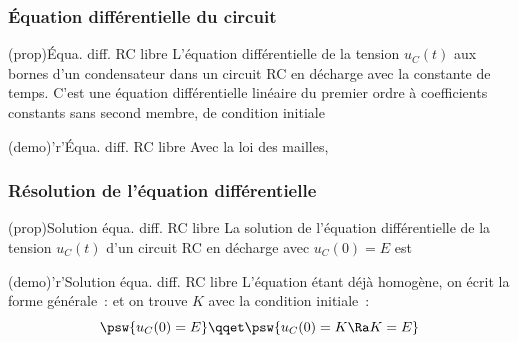 \documentclass[../../main/main.tex]{subfiles}
\begin{document}
\subsubsection{Équation différentielle du circuit}
\begin{tcbraster}[raster columns=2, raster equal height=rows]
	\begin{tcb}[label=prop:eqdiffrc](prop){Équa. diff. RC libre}
		L'équation différentielle de la tension $u_C(t)$ aux bornes d'un
		condensateur dans un circuit RC en décharge
		\psw{
			\[ \boxed{\dv{u_C}{t} + \frac{1}{\tau}u_C = 0}\]
		}
		avec  la constante de temps.
		\tcblower
		C'est une équation différentielle linéaire du premier ordre à
		coefficients constants sans second membre, de condition initiale
		\psw{
			\[ \boxed{u_C(0^-) = u_C(0^+) = E}\]
		}
	\end{tcb}
	\begin{tcb}[label=demo:eqdiffrc](demo)'r'{Équa. diff. RC libre}
		Avec la loi des mailles,
	\end{tcb}
\end{tcbraster}

\subsubsection{Résolution de l'équation différentielle}
\begin{tcbraster}[raster columns=2, raster equal height=rows]
	\begin{tcb}[label=prop:ucsolu](prop){Solution équa. diff. RC libre}
		La solution de l'équation différentielle de la tension $u_C(t)$
		d'un circuit RC en décharge avec $u_C(0) = E$ est
		\psw{
			\[\boxed{u_C(t) = E\exp\left(-\frac{t}{\tau}\right)}\]
		}
	\end{tcb}
	\begin{tcb}[label=demo:rcsolu](demo)'r'{Solution équa. diff. RC libre}
		L'équation étant déjà homogène, on écrit la forme générale~:
		\psw{
			\[u_C(t) = K\exp\left( -\frac{t}{\tau} \right)\]
		}
		et on trouve $K$ avec la condition initiale~:
		\[
			\psw{u_C(0) = E}
			\qqet
			\psw{u_C(0) = K \Ra K=E}
		\]
	\end{tcb}
\end{tcbraster}
\end{document}
